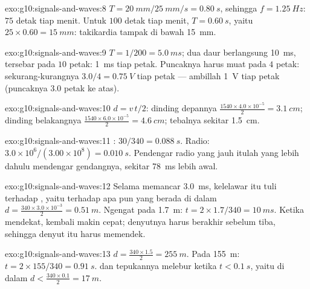 \begin{solution}{exo:g10:signals-and-waves:8}
$T = \qty{20}{mm}/\qty{25}{mm/s} = \qty{0.80}{s}$, sehingga
$f = \qty{1.25}{Hz}$: $75$ detak tiap menit. Untuk $100$ detak tiap
menit, $T = \qty{0.60}{s}$, yaitu $25 \times 0.60 = \qty{15}{mm}$:
takikardia tampak di bawah \qty{15}{mm}.
\end{solution}

\begin{solution}{exo:g10:signals-and-waves:9}
$T = 1/200 = \qty{5.0}{ms}$; dua daur berlangsung \qty{10}{ms}, tersebar
pada $10$ petak:  \qty{1}{ms} tiap petak. Puncaknya harus
muat pada $4$ petak:  sekurang-kurangnya
$3.0/4 = \qty{0.75}{V}$ tiap petak --- ambillah \qty{1}{V} tiap petak
(puncaknya $3.0$ petak ke atas).
\end{solution}

\begin{solution}{exo:g10:signals-and-waves:10}
$d = v\,t/2$: dinding depannya
$\frac{1540 \times 4.0\times10^{-5}}{2} = \qty{3.1}{cm}$; dinding
belakangnya $\frac{1540 \times 6.0\times10^{-5}}{2} = \qty{4.6}{cm}$;
tebalnya sekitar \qty{1.5}{cm}.
\end{solution}

\begin{solution}{exo:g10:signals-and-waves:11}
: $30/340 = \qty{0.088}{s}$. Radio:
$3.0\times10^{6}/(3.00\times10^{8}) = \qty{0.010}{s}$. Pendengar radio
yang jauh itulah yang lebih dahulu mendengar gendangnya, sekitar
\qty{78}{ms} lebih awal.
\end{solution}

\begin{solution}{exo:g10:signals-and-waves:12}
Selama memancar \qty{3.0}{ms}, kelelawar itu tuli terhadap , yaitu
terhadap apa pun yang berada di dalam
$d = \frac{340 \times 3.0\times10^{-3}}{2} =
\qty{0.51}{m}$. Ngengat
pada \qty{1.7}{m}: $t = 2 \times 1.7/340 = \qty{10}{ms}$. Ketika
mendekat,  kembali makin cepat; denyutnya harus berakhir sebelum
 tiba, sehingga denyut itu harus memendek.
\end{solution}

\begin{solution}{exo:g10:signals-and-waves:13}
$d = \frac{340 \times 1.5}{2} = \qty{255}{m}$. Pada \qty{155}{m}:
$t = 2 \times 155/340 = \qty{0.91}{s}$.  dan tepukannya melebur
ketika $t < \qty{0.1}{s}$, yaitu di dalam
$d < \frac{340 \times 0.1}{2} = \qty{17}{m}$.
\end{solution}


